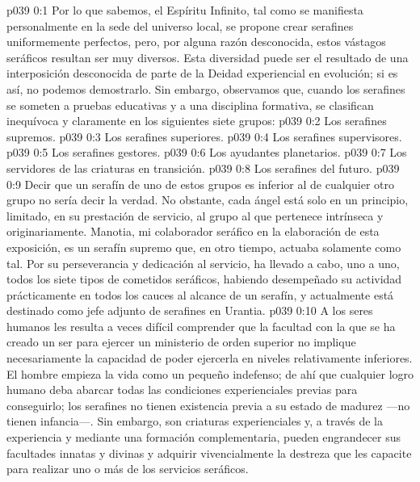 \author{Melquisedec}
\vs p039 0:1 Por lo que sabemos, el Espíritu Infinito, tal como se manifiesta personalmente en la sede del universo local, se propone crear serafines uniformemente perfectos, pero, por alguna razón desconocida, estos vástagos seráficos resultan ser muy diversos. Esta diversidad puede ser el resultado de una interposición desconocida de parte de la Deidad experiencial en evolución; si es así, no podemos demostrarlo. Sin embargo, observamos que, cuando los serafines se someten a pruebas educativas y a una disciplina formativa, se clasifican inequívoca y claramente en los siguientes siete grupos:
\vs p039 0:2 Los serafines supremos.
\vs p039 0:3 Los serafines superiores.
\vs p039 0:4 Los serafines supervisores.
\vs p039 0:5 Los serafines gestores.
\vs p039 0:6 Los ayudantes planetarios.
\vs p039 0:7 Los servidores de las criaturas en transición.
\vs p039 0:8 Los serafines del futuro.
\vs p039 0:9 \pc Decir que un serafín de uno de estos grupos es inferior al de cualquier otro grupo no sería decir la verdad. No obstante, cada ángel está solo en un principio, limitado, en su prestación de servicio, al grupo al que pertenece intrínseca y originariamente. Manotia, mi colaborador seráfico en la elaboración de esta exposición, es un serafín supremo que, en otro tiempo, actuaba solamente como tal. Por su perseverancia y dedicación al servicio, ha llevado a cabo, uno a uno, todos los siete tipos de cometidos seráficos, habiendo desempeñado su actividad prácticamente en todos los cauces al alcance de un serafín, y actualmente está destinado como jefe adjunto de serafines en Urantia.
\vs p039 0:10 A los seres humanos les resulta a veces difícil comprender que la facultad con la que se ha creado un ser para ejercer un ministerio de orden superior no implique necesariamente la capacidad de poder ejercerla en niveles relativamente inferiores. El hombre empieza la vida como un pequeño indefenso; de ahí que cualquier logro humano deba abarcar todas las condiciones experienciales previas para conseguirlo; los serafines no tienen existencia previa a su estado de madurez ---no tienen infancia---. Sin embargo, son criaturas experienciales y, a través de la experiencia y mediante una formación complementaria, pueden engrandecer sus facultades innatas y divinas y adquirir vivencialmente la destreza que les capacite para realizar uno o más de los servicios seráficos.
